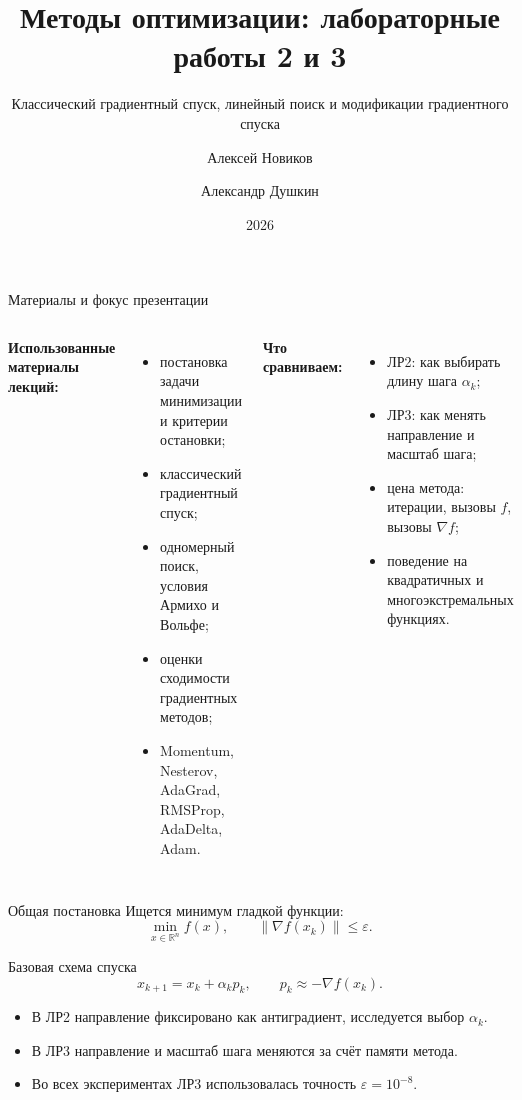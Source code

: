 ﻿\documentclass[10pt,aspectratio=169]{beamer}
\title[ЛР2 и ЛР3]{Методы оптимизации: лабораторные работы 2 и 3}
\subtitle{Классический градиентный спуск, линейный поиск и модификации градиентного спуска}
\author[А. Новиков, А. Душкин]{Алексей Новиков \and Александр Душкин}
\institute{Университет ИТМО · Курс «Методы оптимизации»}
\date{2026}
\newcommand{\grad}{\nabla}
\newcommand{\norm}[1]{\left\lVert #1 \right\rVert}
\newcommand{\eps}{\varepsilon}
\begin{document}
\begin{frame}
    \titlepage
\end{frame}

\begin{frame}{Материалы и фокус презентации}
\begin{columns}[T,onlytextwidth]
\textbf{Использованные материалы лекций:}
\begin{itemize}
    \item постановка задачи минимизации и критерии остановки;
    \item классический градиентный спуск;
    \item одномерный поиск, условия Армихо и Вольфе;
    \item оценки сходимости градиентных методов;
    \item Momentum, Nesterov, AdaGrad, RMSProp, AdaDelta, Adam.
\end{itemize}
\textbf{Что сравниваем:}
\begin{itemize}
    \item ЛР2: как выбирать длину шага $\alpha_k$;
    \item ЛР3: как менять направление и масштаб шага;
    \item цена метода: итерации, вызовы $f$, вызовы $\grad f$;
    \item поведение на квадратичных и многоэкстремальных функциях.
\end{itemize}
\end{columns}
\end{frame}

\begin{frame}{Общая постановка}
Ищется минимум гладкой функции:
\[
    \min_{x\in\mathbb{R}^n} f(x), \qquad \norm{\grad f(x_k)} \le \eps.
\]

\begin{block}{Базовая схема спуска}
\[
    x_{k+1}=x_k+\alpha_k p_k,
    \qquad p_k \approx -\grad f(x_k).
\]
\end{block}

\begin{itemize}
    \item В ЛР2 направление фиксировано как антиградиент, исследуется выбор $\alpha_k$.
    \item В ЛР3 направление и масштаб шага меняются за счёт памяти метода.
    \item Во всех экспериментах ЛР3 использовалась точность $\eps=10^{-8}$.
\end{itemize}
\end{frame}
\end{document}

